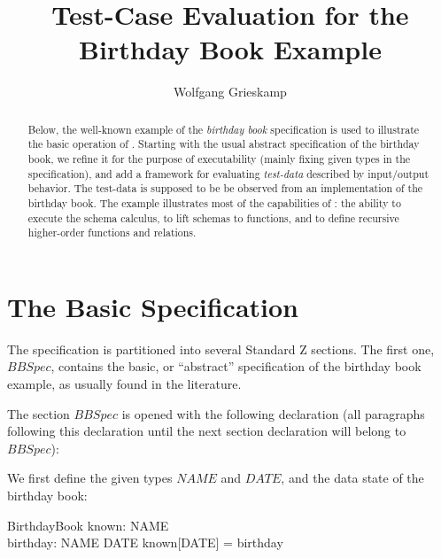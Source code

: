 \documentclass{article}
\begin{document}
\author{Wolfgang Grieskamp}
\title{Test-Case Evaluation for the Birthday Book Example}
\maketitle
\begin{abstract}

Below, the well-known example of the \emph{birthday book}
specification is used to illustrate the basic operation of \ZAP.
Starting with the usual abstract specification of the birthday book,
we refine it for the purpose of executability (mainly fixing given
types in the specification), and add a framework for evaluating
\emph{test-data} described by input/output behavior.
The test-data is supposed to be be observed from an
implementation of the birthday book. The example illustrates most
of the capabilities of \ZAP{}: the ability to execute the schema
calculus, to lift schemas to functions, and to define recursive
higher-order functions and relations. 

\end{abstract}




\section{The Basic Specification}

The specification is partitioned into several Standard Z sections. The
first one, $BBSpec$, contains the basic, or ``abstract'' specification
of the birthday book example, as usually found in the literature.

The section $BBSpec$ is opened with the following declaration (all
paragraphs following this declaration until the next section
declaration will belong to $BBSpec$):

\begin{zdirectives} %
\end{zdirectives}

We first define the given types $NAME$ and $DATE$, and the data
state of the birthday book:

\begin{zedgroup} %

\begin{zed}
\end{zed}

\begin{schema}{BirthdayBook}
  known: \power NAME \\
  birthday: NAME \pfun DATE
\where
  known[DATE] = \dom birthday
\end{schema}

\end{zedgroup}
\end{document}
